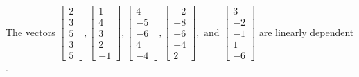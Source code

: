 \begin{exercise}
\begin{exerciseStatement}
  \end{exerciseStatement}
  \begin{exerciseAnswer}
   The vectors \(\left[\begin{array}{r}
2 \\
3 \\
5 \\
3 \\
5
\end{array}\right] , \left[\begin{array}{r}
1 \\
4 \\
3 \\
2 \\
-1
\end{array}\right] , \left[\begin{array}{r}
4 \\
-5 \\
-6 \\
4 \\
-4
\end{array}\right] , \left[\begin{array}{r}
-2 \\
-8 \\
-6 \\
-4 \\
2
\end{array}\right] , \text{ and } \left[\begin{array}{r}
3 \\
-2 \\
-1 \\
1 \\
-6
\end{array}\right]\) are 
  	 linearly dependent  .
  


  \end{exerciseAnswer}
\end{exercise}